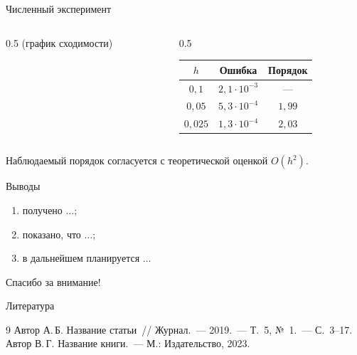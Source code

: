 \documentclass[aspectratio=169, 12pt]{beamer}
\begin{document}
\begin{frame}{Численный эксперимент}
  \begin{columns}[T]
    \begin{column}{0.5\textwidth}
      \centering\footnotesize (график сходимости)
    \end{column}
    \begin{column}{0.5\textwidth}
      \centering
      \begin{tabular}{ccc}
        \toprule
        $h$ & Ошибка & Порядок \\
        \midrule
        $0{,}1$  & $2{,}1\cdot10^{-3}$ & --- \\
        $0{,}05$ & $5{,}3\cdot10^{-4}$ & $1{,}99$ \\
        $0{,}025$& $1{,}3\cdot10^{-4}$ & $2{,}03$ \\
        \bottomrule
      \end{tabular}
    \end{column}
  \end{columns}

  \vspace{0.8em}
  Наблюдаемый порядок согласуется с теоретической оценкой $O(h^2)$.
\end{frame}

\begin{frame}{Выводы}
  \begin{enumerate}
    \item получено $\ldots$;
    \item показано, что $\ldots$;
    \item в дальнейшем планируется $\ldots$
  \end{enumerate}

  \vspace{1em}
  \centering\alert{Спасибо за внимание!}
\end{frame}

\begin{frame}[allowframebreaks]{Литература}
  \footnotesize
  \begin{thebibliography}{9}
     Автор А.\,Б. Название статьи~// Журнал.~--- 2019.~--- Т.~5, №~1.~--- С.~3--17.
     Автор В.\,Г. Название книги.~--- М.: Издательство, 2023.
  \end{thebibliography}
\end{frame}
\end{document}
